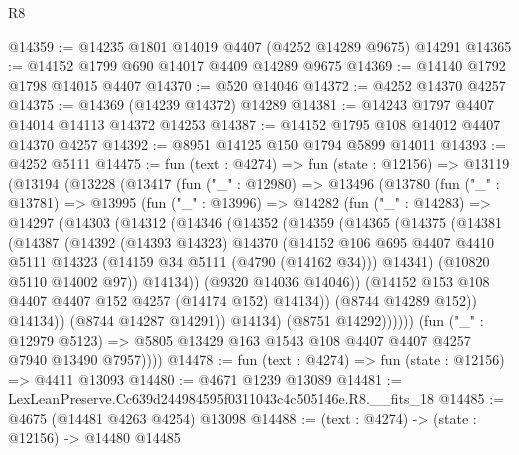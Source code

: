 \begin{lexlean}{R8}
\begin{coremodule}
@14359 := @14235 @1801 @14019 @4407 (@4252 @14289 @9675) @14291
@14365 := @14152 @1799 @690 @14017 @4409 @14289 @9675
@14369 := @14140 @1792 @1798 @14015 @4407
@14370 := @520 @14046
@14372 := @4252 @14370 @4257
@14375 := @14369 (@14239 @14372) @14289
@14381 := @14243 @1797 @4407 @14014 @14113 @14372 @14253
@14387 := @14152 @1795 @108 @14012 @4407 @14370 @4257
@14392 := @8951 @14125 @150 @1794 @5899 @14011
@14393 := @4252 @5111
@14475 := fun (text : @4274) =>
  fun (state : @12156) =>
  @13119
    (@13194
      (@13228
        (@13417
          (fun ("_" : @12980) =>
          @13496
            (@13780
              (fun ("_" : @13781) =>
              @13995
                (fun ("_" : @13996) =>
                @14282
                  (fun ("_" : @14283) =>
                  @14297
                    (@14303
                      (@14312
                        (@14346
                          (@14352
                            (@14359
                              (@14365
                                (@14375
                                  (@14381
                                    (@14387
                                      (@14392
                                        (@14393 @14323)
                                        @14370
                                        (@14152
                                          @106
                                          @695
                                          @4407
                                          @4410
                                          @5111
                                          @14323
                                          (@14159 @34 @5111 (@4790 (@14162 @34)))
                                          @14341)
                                        (@10820 @5110 @14002 @97))
                                      @14134))
                                  (@9320 @14036 @14046))
                                (@14152 @153 @108 @4407 @4407 @152 @4257 (@14174 @152) @14134))
                              (@8744 @14289 @152))
                            @14134))
                        (@8744 @14287 @14291))
                      @14134)
                    (@8751 @14292))))))
          (fun ("_" : @12979 @5123) =>
          @5805 @13429 @163 @1543 @108 @4407 @4407 @4257 @7940 @13490 @7957))))
@14478 := fun (text : @4274) => fun (state : @12156) => @4411 @13093
@14480 := @4671 @1239 @13089
@14481 := LexLeanPreserve.Cc639d244984595f0311043c4c505146e.R8.__fits_18
@14485 := @4675 (@14481 @4263 @4254) @13098
@14488 := (text : @4274) -> (state : @12156) -> @14480 @14485

\end{coremodule}
\end{lexlean}
